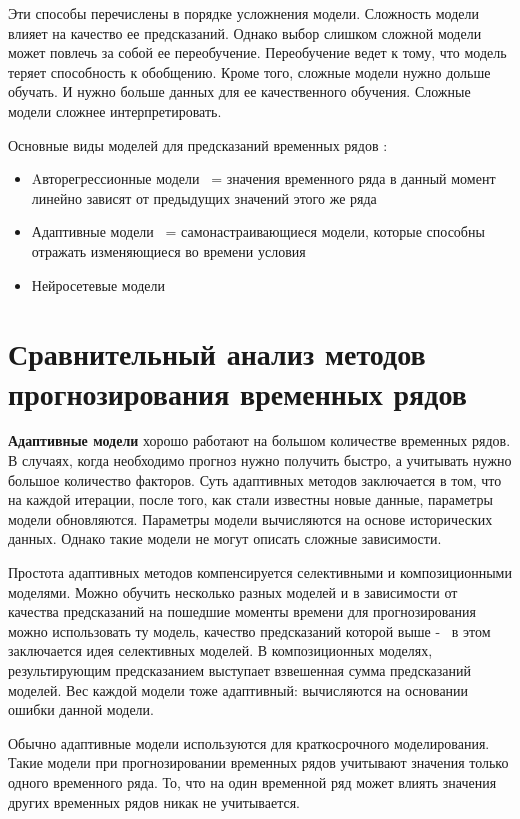Эти способы перечислены в порядке усложнения модели. Сложность модели влияет на
качество ее предсказаний. Однако выбор слишком сложной модели может повлечь
за собой ее переобучение. Переобучение ведет к тому, что модель теряет способность
к обобщению. Кроме того, сложные модели нужно дольше обучать. И нужно больше данных
для ее качественного обучения. Сложные модели сложнее интерпретировать.

Основные виды моделей для предсказаний временных рядов \cite{voron}:
\begin{itemize}
	\item Aвторегрессионные модели ~= значения временного ряда в данный момент линейно зависят от предыдущих значений этого же ряда
	\item Адаптивные модели ~= самонастраивающиеся модели, которые способны отражать изменяющиеся во времени условия
	\item Нейросетевые модели
\end{itemize}


\section{Сравнительный анализ методов прогнозирования временных рядов}

\textbf{Адаптивные модели} хорошо работают на большом количестве временных рядов.
В случаях, когда необходимо прогноз нужно получить быстро, а учитывать
нужно большое количество факторов. Суть адаптивных
методов заключается в том, что на каждой итерации, после того, как стали
известны новые данные, параметры модели обновляются. Параметры модели вычисляются
на основе исторических данных. Однако такие модели не могут описать сложные
зависимости.

Простота адаптивных методов компенсируется селективными и композиционными моделями.
Можно обучить несколько разных моделей и в зависимости от качества предсказаний на пошедшие
моменты времени для прогнозирования можно использовать ту модель, качество предсказаний
которой выше -~ в этом заключается идея селективных моделей. В композиционных моделях,
результирующим предсказанием выступает взвешенная сумма предсказаний моделей. Вес каждой модели
тоже адаптивный: вычисляются на основании ошибки данной модели.

Обычно адаптивные модели используются для краткосрочного моделирования.
Такие модели при прогнозировании временных рядов учитывают значения только одного временного ряда.
То, что на один временной ряд может влиять значения других временных рядов никак не учитывается.

